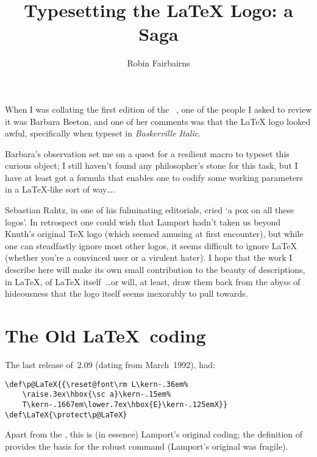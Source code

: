 %
\makeatletter
\DeclareRobustCommand{\stdLaTeX}{L\kern-.36em
  {%
    \sbox\z@ T%
    \vbox to\ht0{\hbox{$\m@th$%
        \csname S@\f@size\endcsname
        \fontsize\sf@size\z@
        \math@fontsfalse\selectfont
        A}%
      \vss}%
  }%
  \kern-.15em
  \TeX}
%
\DeclareRobustCommand{\faqLaTeX}{L%
  {%
    \setbox0\hbox{T}%
    \setbox\@tempboxa\hbox{$\m@th$%
      \csname S@\f@size\endcsname
      \fontsize\sf@size\z@
      \math@fontsfalse\selectfont
      A}%
    \@tempdima\ht0
    \advance\@tempdima-\ht\@tempboxa
    \@tempdima\strip@pt\fontdimen1\font\@tempdima
    \advance\@tempdima-.36em
    \kern\@tempdima
    \vbox to\ht0{\box\@tempboxa
      \vss}%
  }%
  \kern-.15em
  \TeX}
\makeatother
%
\title{Typesetting the \LaTeX{} Logo: a Saga}
\author{Robin Fairbairns}
\begin{Article}
  When I was collating the first edition of the \uktug\ ,
  one of the people I asked to review it was Barbara Beeton, and one
  of her comments was that the \LaTeX{} logo looked awful,
  specifically when typeset in \emph{Baskerville Italic}.

  Barbara's observation set me on a quest for a resilient macro to
  typeset this curious object; I still haven't found any philosopher's
  stone for this task, but I have at least got a formula that enables
  one to codify some working parameters in a \LaTeX-like sort of
  way\dots.

  Sebastian Rahtz, in one of his fulminating editorials, cried `a pox
  on all these logos'.  In retrospect one could wish that Lamport
  hadn't taken us beyond Knuth's original \TeX{} logo (which seemed
  amusing at first encounter), but while one can steadfastly ignore
  most other logos, it seems difficult to ignore \LaTeX{} (whether
  you're a convinced user or a virulent hater).  I hope that the work
  I describe here will make its own small contribution to the beauty
  of descriptions, in \LaTeX{}, of \LaTeX{} itself~\dots or will, at
  least, draw them back from the abyss of hideousness that the logo
  itself seems inexorably to pull towards.

  \section{The Old \LaTeX\ coding}

  The last release of~2.09 (dating from March~1992), had:
\begin{verbatim}
\def\p@LaTeX{{\reset@font\rm L\kern-.36em%
    \raise.3ex\hbox{\sc a}\kern-.15em%
    T\kern-.1667em\lower.7ex\hbox{E}\kern-.125emX}}
\def\LaTeX{\protect\p@LaTeX}
\end{verbatim}
  Apart from the , this is (in essence) Lamport's
  original coding; the definition of  provides the basis
  for the robust command  (Lamport's original was fragile).


\end{Article}
